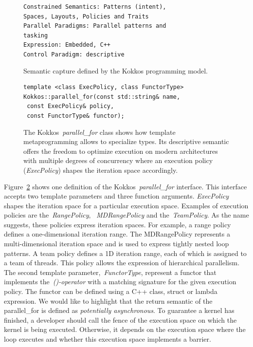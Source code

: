 \begin{figure}[h]
\begin{verbatim}
Constrained Semantics: Patterns (intent),
Spaces, Layouts, Policies and Traits
Parallel Paradigms: Parallel patterns and 
tasking
Expression: Embedded, C++
Control Paradigm: descriptive
\end{verbatim}
\caption{Semantic capture defined by the Kokkos programming model.}
\label{fig:SemCaptureKokkos}
\end{figure}

\begin{figure}
\begin{verbatim}
template <class ExecPolicy, class FunctorType>
Kokkos::parallel_for(const std::string& name, 
 const ExecPolicy& policy, 
 const FunctorType& functor);
\end{verbatim}
\caption{The Kokkos~\emph{parallel\_for} class shows how template metaprogramming allows to specialize types. Its descriptive semantic offers the freedom to optimize execution on modern architectures with multiple degrees of concurrency where an execution policy (\emph{ExecPolicy}) shapes the iteration space accordingly.}
\label{fig:parallelFor}
\end{figure}

Figure~\ref{fig:parallelFor} shows one definition of the Kokkos~\emph{parallel\_for} interface. This interface accepts two template parameters and three function arguments. \emph{ExecPolicy} shapes the iteration space for a particular execution space. Examples of execution policies are the~\emph{RangePolicy}, ~\emph{MDRangePolicy} and the~\emph{TeamPolicy}. As the name suggests, these policies express iteration spaces. For example, a range policy defines a one-dimensional iteration range. The MDRangePolicy represents a multi-dimensional iteration space and is used to express tightly nested loop patterns. A team policy defines a 1D iteration range, each of which is assigned to a team of threads. This policy allows the expression of hierarchical parallelism. The second template parameter,~\emph{FunctorType}, represent a functor that implements the~\emph{()-operator} with a matching signature for the given execution policy. The functor can be defined using a C++ class, struct or lambda expression. We would like to highlight that the return semantic of the parallel\_for is defined as \emph{potentially asynchronous}. To guarantee a kernel has finished, a developer should call the fence of the execution space on which the kernel is being executed. Otherwise, it depends on the execution space where the loop executes and whether this execution space implements a barrier. 

